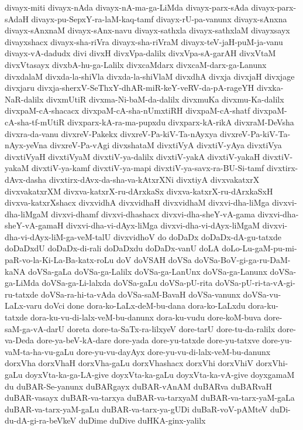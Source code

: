 {divayx-miti
divayx-nAda
divayx-nA-ma-ga-LiMda
divayx-parx-sAda
divayx-parx-sAdaH
divayx-pu-SepxY-ra-laM-kaq-tamf
divayx-rU-pa-vanunx
divayx-sAnxna
divayx-sAnxnaM
divayx-sAnx-navu
divayx-sathxla
divayx-sathxlaM
divayxsayx
divayxshacx
divayx-sha-riVra
divayx-sha-riVraM
divayx-teV-jaH-puM-ja-vanu
divayx-vA-dadudx
divi
divxH
divxVpa-dalilx
divxVpa-sA-garAH
divxVtaM
divxVtasayx
divxbA-hu-ga-Lalilx
divxcaMdarx
divxcaM-darx-ga-Lanunx
divxdalaM
divxda-la-shiVla
divxda-la-shiVlaM
divxdhA
divxja
divxjaH
divxjage
divxjaru
divxja-sherxV-SeThxY-dhAR-miR-keY-veRV-da-pA-rageYH
divxka-NaR-dalilx
divxmUtiR
divxma-Ni-baM-da-dalilx
divxmuKa
divxmu-Ka-dalilx
divxpaM-cA-shacacx
divxpaM-cA-sha-nUmxtiRH
divxpaM-cA-shatf
divxpaM-cA-sha-tf-mUtiR
divxparx-kA-ra-ma-pupxdu
divxparx-kA-rikA
divxraM-DeVsha
divxra-da-vanu
divxreV-Pakekx
divxreV-Pa-kiV-Ta-nAyxya
divxreV-Pa-kiV-Ta-nAyx-yeVna
divxreV-Pa-vAgi
divxshataM
divxtiVyA
divxtiV-yAya
divxtiVya
divxtiVyaH
divxtiVyaM
divxtiV-ya-dalilx
divxtiV-yakA
divxtiV-yakaH
divxtiV-yakaM
divxtiV-ya-kamf
divxtiV-ya-mapi
divxtiV-ya-savx-ra-BU-Si-tamf
divxtirx-dAvx-dasha
divxtirx-dAvx-da-sha-va-kAtxrXNi
divxtiyA
divxvakatxrX
divxvakatxrXM
divxva-katxrX-ru-dArxkaSx
divxva-katxrX-ru-dArxkaSxH
divxva-katxrXshacx
divxvidhA
divxvidhaH
divxvidhaM
divxvi-dha-liMga
divxvi-dha-liMgaM
divxvi-dhamf
divxvi-dhashacx
divxvi-dha-sheY-vA-gama
divxvi-dha-sheY-vA-gamaH
divxvi-dha-vi-dAyx-liMga
divxvi-dha-vi-dAyx-liMgaM
divxvi-dha-vi-dAyx-liM-ga-veM-talU
divxvidhoV
do
doDaDx
doDaDx-dA-gu-tatxde
doDaDxdU
doDaDx-di-rali
doDaDxdu
doDaDx-vanU
doLA
doLo-Lu-gaM-pu-mi-paR-vo-la-Ki-La-Ba-katx-roLu
doV
doVSAH
doVSa
doVSa-BoV-gi-ga-ru-DaM-kaNA
doVSa-gaLa
doVSa-ga-Lalilx
doVSa-ga-LanUnx
doVSa-ga-Lanunx
doVSa-ga-LiMda
doVSa-ga-Li-lalxda
doVSa-gaLu
doVSa-pU-rita
doVSa-pU-ri-ta-vA-gi-ru-tatxde
doVSa-ra-hi-ta-vAda
doVSa-saM-BavaH
doVSa-vanunx
doVSa-vu-LaLx-varu
doVci
done
dora-ko-LaLx-deM-bu-dana
dora-ko-LaLxdu
dora-ku-tatxde
dora-ku-vu-di-lalx-veM-bu-danunx
dora-ku-vudu
dore-koM-buva
dore-saM-ga-vA-darU
doreta
dore-ta-SaTx-ra-lilxyeV
dore-tarU
dore-tu-da-ralilx
dore-va-Deda
dore-ya-beV-kA-dare
dore-yada
dore-yu-tatxde
dore-yu-tatxve
dore-yu-vaM-ta-ha-vu-gaLu
dore-yu-vu-dayAyx
dore-yu-vu-di-lalx-veM-bu-danunx
dorxVha
dorxVhaH
dorxVha-gaLu
dorxVhashacx
dorxVhi
dorxVhiV
dorxVhi-gaLu
doyxVta-ka-ga-LA-give
doyxVta-ka-gaLu
doyxVta-ka-vA-give
doyxgamaM
du
duBAR-Se-yanunx
duBARgayx
duBAR-vAnAM
duBARva
duBARvaH
duBAR-vasayx
duBAR-va-tarxya
duBAR-va-tarxyaM
duBAR-va-tarx-yaM-gaLa
duBAR-va-tarx-yaM-gaLu
duBAR-va-tarx-ya-gUDi
duBaR-voV-pAMteV
duDi-du-dA-gi-ra-beVkeV
duDime
duDive
duHKA-ginx-yalilx
}
